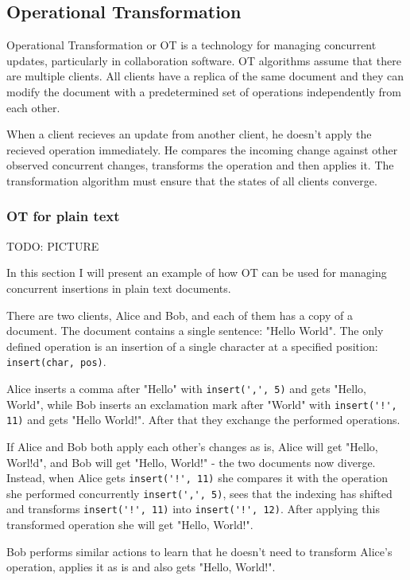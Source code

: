 \documentclass[a4paper, 11pt, oneside]{article}
\theoremstyle{definition}
\begin{document}
\subsection{Operational Transformation}

Operational Transformation \cite{ot} or OT is a technology for managing concurrent updates, particularly in collaboration software. OT algorithms assume that there are multiple clients. All clients have a replica of the same document and they can modify the document with a predetermined set of operations independently from each other.

When a client recieves an update from another client, he doesn't apply the recieved operation immediately. He compares the incoming change against other observed concurrent changes, transforms the operation and then applies it. The transformation algorithm must ensure that the states of all clients converge.

\subsubsection{OT for plain text}
TODO: PICTURE

In this section I will present an example of how OT can be used for managing concurrent insertions in plain text documents.

There are two clients, Alice and Bob, and each of them has a copy of a document. The document contains a single sentence: "Hello World". The only defined operation is an insertion of a single character at a specified position: \verb|insert(char, pos)|.


Alice inserts a comma after "Hello" with \verb|insert(',', 5)| and gets "Hello, World", while Bob inserts an exclamation mark after "World" with \verb|insert('!', 11)| and gets "Hello World!". After that they exchange the performed operations.

If Alice and Bob both apply each other's changes as is, Alice will get "Hello, Worl!d", and Bob will get "Hello, World!" - the two documents now diverge. Instead, when Alice gets \verb|insert('!', 11)| she compares it with the operation she performed concurrently \verb|insert(',', 5)|, sees that the indexing has shifted and transforms \verb|insert('!', 11)| into \verb|insert('!', 12)|. After applying this transformed operation she will get "Hello, World!". 

Bob performs similar actions to learn that he doesn't need to transform Alice's operation, applies it as is and also gets "Hello, World!".
\end{document}
